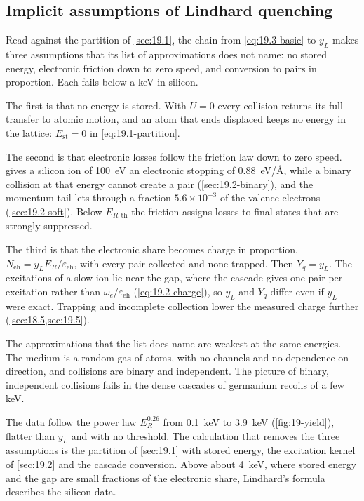 \subsection{Implicit assumptions of Lindhard quenching}\label{sec:19.3-assumptions}

Read against the partition of \cref{sec:19.1}, the chain from \cref{eq:19.3-basic} to $y_L$ makes three assumptions that its list of approximations does not name: no stored energy, electronic friction down to zero speed, and conversion to pairs in proportion. Each fails below a keV in silicon.

The first is that no energy is stored. With $U = 0$ every collision returns its full transfer to atomic motion, and an atom that ends displaced keeps no energy in the lattice: $E_{\mathrm{st}} = 0$ in \cref{eq:19.1-partition}.

The second is that electronic losses follow the friction law down to zero speed.  gives a silicon ion of \SI{100}{eV} an electronic stopping of \SI{0.88}{eV/\angstrom}, while a binary collision at that energy cannot create a pair (\cref{sec:19.2-binary}), and the momentum tail lets through a fraction $5.6\times10^{-3}$ of the valence electrons (\cref{sec:19.2-soft}). Below $E_{R,\mathrm{th}}$ the friction assigns losses to final states that are strongly suppressed.

The third is that the electronic share becomes charge in proportion, $N_{\mathrm{eh}} = y_LE_R/\varepsilon_{\mathrm{eh}}$, with every pair collected and none trapped. Then $Y_q = y_L$. The excitations of a slow ion lie near the gap, where the cascade gives one pair per excitation rather than $\omega_e/\varepsilon_{\mathrm{eh}}$ (\cref{eq:19.2-charge}), so $y_L$ and $Y_q$ differ even if $y_L$ were exact. Trapping and incomplete collection lower the measured charge further (\cref{sec:18.5,sec:19.5}).

The approximations that the list does name are weakest at the same energies. The medium is a random gas of atoms, with no channels and no dependence on direction, and collisions are binary and independent. The picture of binary, independent collisions fails in the dense cascades of germanium recoils of a few keV.

The data follow the power law $E_R^{0.26}$ from \SI{0.1}{keV} to \SI{3.9}{keV} (\cref{fig:19-yield}), flatter than $y_L$ and with no threshold. The calculation that removes the three assumptions is the partition of \cref{sec:19.1} with stored energy, the excitation kernel of \cref{sec:19.2} and the cascade conversion. Above about \SI{4}{keV}, where stored energy and the gap are small fractions of the electronic share, Lindhard's formula describes the silicon data.

